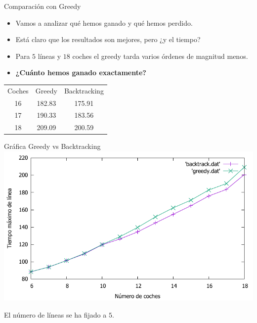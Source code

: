 \begin{frame}{Comparación con Greedy}
	\begin{itemize}
		\item Vamos a analizar qué hemos ganado y qué hemos perdido.
		\pause
		\item Está claro que los resultados son mejores, pero ¿y el tiempo?
		\pause
		\item Para $5$ líneas y $18$ coches el greedy tarda varios órdenes de magnitud menos.
		\item \textbf{¿Cuánto hemos ganado exactamente?}
		

	\end{itemize}
	\begin{center}
			\begin{tabular}{c|c|c}
				Coches	& Greedy  & Backtracking  \\ 
				16  & 182.83 & 175.91 \\
				17	& 190.33 & 183.56 \\ 
				18	& 209.09 & 200.59
			\end{tabular}
			
	\end{center}

\end{frame}

\begin{frame}{Gráfica Greedy vs Backtracking}
	\includegraphics[width = \linewidth]{./img/comp.pdf}
	
	El número de líneas se ha fijado a $5$.
\end{frame}

